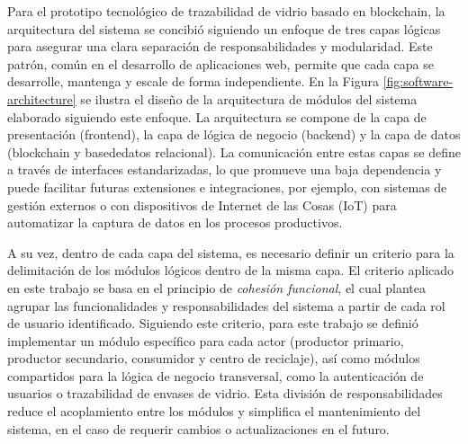 Para el prototipo tecnológico de trazabilidad de vidrio basado en blockchain, la arquitectura del sistema se concibió siguiendo un enfoque de tres capas lógicas para asegurar una clara separación de responsabilidades y modularidad. Este patrón, común en el desarrollo de aplicaciones web, permite que cada capa se desarrolle, mantenga y escale de forma independiente. En la Figura \ref{fig:software-architecture} se ilustra el diseño de la arquitectura de módulos del sistema elaborado siguiendo este enfoque. La arquitectura se compone de la capa de presentación (\gls{frontend}), la capa de lógica de negocio (\gls{backend}) y la capa de datos (\gls{blockchain} y \gls{basededatos} relacional). La comunicación entre estas capas se define a través de interfaces estandarizadas, lo que promueve una baja dependencia y puede facilitar futuras extensiones e integraciones, por ejemplo, con sistemas de gestión externos o con dispositivos de Internet de las Cosas (IoT) para automatizar la captura de datos en los procesos productivos.

A su vez, dentro de cada capa del sistema, es necesario definir un criterio para la delimitación de los módulos lógicos dentro de la misma capa. El criterio aplicado en este trabajo se basa en el principio de \textit{cohesión funcional}, el cual plantea agrupar las funcionalidades y responsabilidades del sistema a partir de cada rol de usuario identificado. Siguiendo este criterio, para este trabajo se definió implementar un módulo específico para cada actor (productor primario, productor secundario, consumidor y centro de reciclaje), así como módulos compartidos para la lógica de negocio transversal, como la autenticación de usuarios o trazabilidad de envases de vidrio. Esta división de responsabilidades reduce el acoplamiento entre los módulos y simplifica el mantenimiento del sistema, en el caso de requerir cambios o actualizaciones en el futuro.

